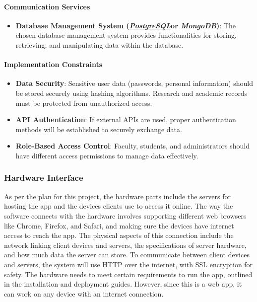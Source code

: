 \documentclass[11pt]{article}
\newcommand{\PostgreSQL}{\href{https://www.postgresql.org/}{\textbf{{\textcolor{postgresColor}{\textit{PostgreSQL}}}}}}
\begin{document}
\paragraph{Communication Services}
\begin{itemize}
    \item \textbf{Database Management System (\PostgreSQL\space or \textit{MongoDB})}: The chosen database management system provides functionalities for storing, retrieving, and manipulating data within the database.
\end{itemize}

\paragraph{Implementation Constraints}
\begin{itemize}
    \item \textbf{Data Security}: Sensitive user data (passwords, personal information) should be stored securely using hashing algorithms. Research and academic records must be protected from unauthorized access.
    \item \textbf{API Authentication}: If external APIs are used, proper authentication methods will be established to securely exchange data.
    \item \textbf{Role-Based Access Control}: Faculty, students, and administrators should have different access permissions to manage data effectively.
\end{itemize}

\subsubsection{Hardware Interface}
As per the plan for this project, the hardware parts include the servers for hosting the app and the devices clients use to access it online. The way the software connects with the hardware involves supporting different web browsers like Chrome, Firefox, and Safari, and making sure the devices have internet access to reach the app. The physical aspects of this connection include the network linking client devices and servers, the specifications of server hardware, and how much data the server can store. To communicate between client devices and servers, the system will use HTTP over the internet, with SSL encryption for safety. The hardware needs to meet certain requirements to run the app, outlined in the installation and deployment guides. However, since this is a web app, it can work on any device with an internet connection.
\end{document}
